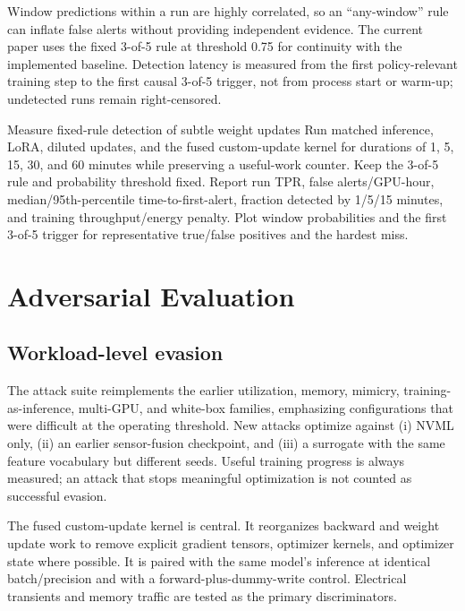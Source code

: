 \documentclass[sigplan,anonymous,review,nonacm]{acmart}
\begin{document}
Window predictions within a run are highly correlated, so an ``any-window'' rule can inflate false alerts without providing independent evidence. The current paper uses the fixed 3-of-5 rule at threshold 0.75 for continuity with the implemented baseline. Detection latency is measured from the first policy-relevant training step to the first causal 3-of-5 trigger, not from process start or warm-up; undetected runs remain right-censored.

\begin{experimentbox}{Measure fixed-rule detection of subtle weight updates}
Run matched inference, LoRA, diluted updates, and the fused custom-update kernel for durations of 1, 5, 15, 30, and 60 minutes while preserving a useful-work counter. Keep the 3-of-5 rule and probability threshold fixed. Report run TPR, false alerts/GPU-hour, median/95th-percentile time-to-first-alert, fraction detected by 1/5/15 minutes, and training throughput/energy penalty. Plot window probabilities and the first 3-of-5 trigger for representative true/false positives and the hardest miss.
\end{experimentbox}

\section{Adversarial Evaluation}

\subsection{Workload-level evasion}

The attack suite reimplements the earlier utilization, memory, mimicry, training-as-inference, multi-GPU, and white-box families, emphasizing configurations that were difficult at the operating threshold. New attacks optimize against (i) NVML only, (ii) an earlier sensor-fusion checkpoint, and (iii) a surrogate with the same feature vocabulary but different seeds. Useful training progress is always measured; an attack that stops meaningful optimization is not counted as successful evasion.

The fused custom-update kernel is central. It reorganizes backward and weight update work to remove explicit gradient tensors, optimizer kernels, and optimizer state where possible. It is paired with the same model's inference at identical batch/precision and with a forward-plus-dummy-write control. Electrical transients and memory traffic are tested as the primary discriminators.
\end{document}
